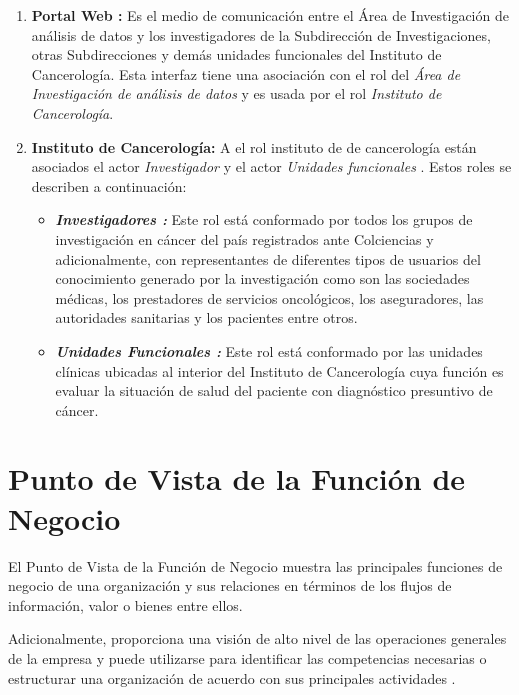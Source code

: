 \begin{enumerate}[label=\textbf{\arabic*})]
\item  \textbf{Portal Web :} Es el medio de comunicación entre el Área de Investigación de análisis de datos  y los investigadores de la Subdirección de Investigaciones, otras Subdirecciones y demás unidades funcionales del Instituto  de Cancerología. Esta interfaz tiene una asociación con el rol del  \textit{Área de Investigación de análisis de datos}  y es usada por el rol \textit{Instituto  de Cancerología}.

\newpage
\item  \textbf{Instituto  de Cancerología:} A el rol  instituto de  de cancerología están asociados el actor \textit{Investigador } y el actor \textit{Unidades funcionales }. Estos roles se describen a continuación: 
\begin{itemize}
\item  \textbf{\textit{Investigadores :}}  Este rol está conformado por todos los grupos de investigación en cáncer del país registrados ante Colciencias y adicionalmente, con representantes de diferentes tipos de usuarios del conocimiento generado por la investigación como son las sociedades médicas, los prestadores de servicios oncológicos, los aseguradores, las autoridades sanitarias y los pacientes entre otros. 

\item  \textbf{\textit{Unidades Funcionales :}}  Este rol está conformado por las unidades clínicas ubicadas al interior del Instituto  de Cancerología cuya función es evaluar la situación de salud del paciente con diagnóstico presuntivo de cáncer. 
\end{itemize}
\end{enumerate}

\newpage
\section{Punto de Vista de la Función de Negocio}
El Punto de Vista de la Función de Negocio muestra las principales funciones de negocio de una organización y sus relaciones en términos de los flujos de información, valor o bienes entre
ellos.

Adicionalmente, proporciona una visión de alto nivel de las operaciones generales de la empresa y puede utilizarse para identificar las competencias necesarias o estructurar una organización de acuerdo con sus principales actividades
\cite{BolanosCastro2019}.

